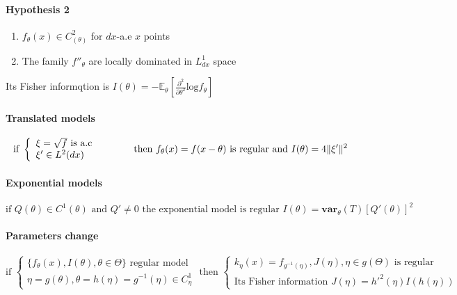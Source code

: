 \documentclass[a4paper,10pt]{article}
\begin{document}
\paragraph{Hypothesis 2}
\begin{enumerate}
 \item $f_{\theta}(x) \in C^2_{(\theta)}$ for $dx$-a.e $x$ points 
 \item The family {$f''_{\theta}$} are locally dominated in $L^1_{dx}$ space
\end{enumerate}
Its Fisher informqtion is $I(\theta) = -\mathbb{E}_{\theta}[ \frac{\partial^2}{\partial \theta^2} \text{log}f_{\theta} ]$

\paragraph{Translated models}
\[
\text{if }
\left\{
\begin{array}{l}
\xi = \sqrt{f} \text{ is a.c } \\
\xi' \in L^2(dx)
\end{array}\right.
\hspace{10mm}
\text{ then }
f_{\theta}(x)=f(x-\theta) \text{ is regular and } I(\theta)=4\| \xi' \|^2 
\]
\paragraph{Exponential models}
\[
\text{if } Q(\theta) \in C^{1}(\theta) \text{ and } Q'\neq 0 \text{ the exponential model is regular } I(\theta) = \textbf{var}_{\theta}(T)[Q'(\theta)]^2
\]
\paragraph{Parameters change}
\[
\text{if }
\left\{
\begin{array}{l}
\{f_{\theta}(x) ,I(\theta) , \theta \in \Theta\} \text{ regular model} \\
\eta = g(\theta), \theta = h(\eta)=g^{-1}(\eta) \in C^1_{\eta}
\end{array}\right.
\text{ then }
\left\{
\begin{array}{l}
k_{\eta}(x) = f_{g^{-1}(\eta)} ,J(\eta), \eta \in g(\Theta) \text{ is regular} \\
\text{Its Fisher information } J(\eta) =  h'^2(\eta) I(h(\eta)) 
\end{array}\right.
\]
\end{document}

